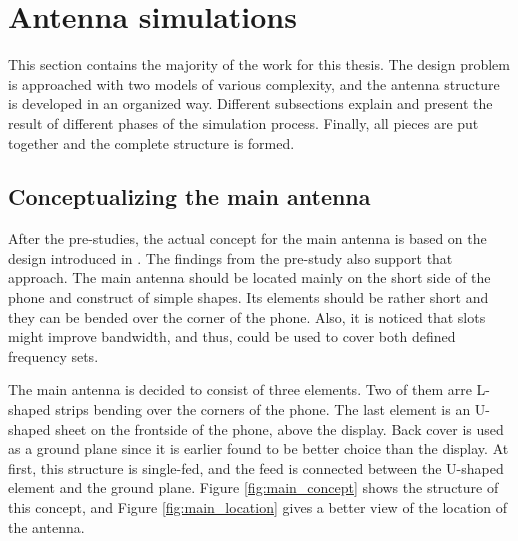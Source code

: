 \section{Antenna simulations}
\label{sec:simulations}
This section contains the majority of the work for this thesis. The design problem is approached with two models of various complexity, and the antenna structure is developed in an organized way. Different subsections explain and present the result of different phases of the simulation process. Finally, all pieces are put together and the complete structure is formed.


\subsection{Conceptualizing the main antenna}
\label{sec:conceptualizing}
After the pre-studies, the actual concept for the main antenna is based on the design introduced in \cite{kimmo}. The findings from the pre-study also support that approach. The main antenna should be located mainly on the short side of the phone and construct of simple shapes. Its elements should be rather short and they can be bended over the corner of the phone. Also, it is noticed that slots might improve bandwidth, and thus, could be used to cover both defined frequency sets. 

The main antenna is decided to consist of three elements. Two of them arre L-shaped strips bending over the corners of the phone. The last element is an U-shaped sheet on the frontside of the phone, above the display. Back cover is used as a ground plane since it is earlier found to be better choice than the display. At first, this structure is single-fed, and the feed is connected between the U-shaped element and the ground plane. Figure \ref{fig:main_concept} shows the structure of this concept, and Figure \ref{fig:main_location} gives a better view of the location of the antenna.

